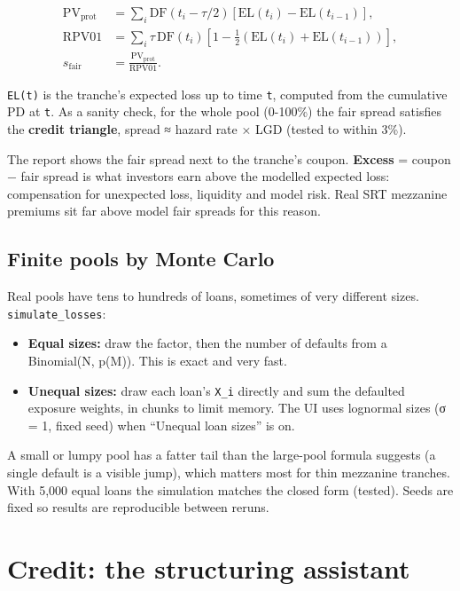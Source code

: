 \documentclass[10pt,a4paper]{article}
\providecommand{\tightlist}{\setlength{\itemsep}{1pt}\setlength{\parskip}{0pt}}
\numberwithin{equation}{section}
\begin{document}
\begin{align}
\mathrm{PV}_{\mathrm{prot}}&=\sum_i\mathrm{DF}(t_i-\tau/2)
\left[\mathrm{EL}(t_i)-\mathrm{EL}(t_{i-1})\right],\\
\mathrm{RPV01}&=\sum_i\tau\,\mathrm{DF}(t_i)
\left[1-\tfrac12\left(\mathrm{EL}(t_i)+\mathrm{EL}(t_{i-1})\right)\right],\\
s_{\mathrm{fair}}&=\frac{\mathrm{PV}_{\mathrm{prot}}}{\mathrm{RPV01}}.
\end{align}

\texttt{EL(t)} is the tranche's expected loss up to time \texttt{t}, computed from the cumulative PD at \texttt{t}. As a sanity check, for the whole pool (0-100\%) the fair spread satisfies the \textbf{credit triangle}, spread ≈ hazard rate × LGD (tested to within 3\%).

The report shows the fair spread next to the tranche's coupon. \textbf{Excess} = coupon − fair spread is what investors earn above the modelled expected loss: compensation for unexpected loss, liquidity and model risk. Real SRT mezzanine premiums sit far above model fair spreads for this reason.

\subsection{Finite pools by Monte Carlo}\label{finite-pools-by-monte-carlo}

Real pools have tens to hundreds of loans, sometimes of very different sizes. \texttt{simulate\_losses}:

\begin{itemize}
\tightlist
\item
  \textbf{Equal sizes:} draw the factor, then the number of defaults from a Binomial(N, p(M)). This is exact and very fast.
\item
  \textbf{Unequal sizes:} draw each loan's \texttt{X\_i} directly and sum the defaulted exposure weights, in chunks to limit memory. The UI uses lognormal sizes (σ = 1, fixed seed) when ``Unequal loan sizes'' is on.
\end{itemize}

A small or lumpy pool has a fatter tail than the large-pool formula suggests (a single default is a visible jump), which matters most for thin mezzanine tranches. With 5,000 equal loans the simulation matches the closed form (tested). Seeds are fixed so results are reproducible between reruns.

\section{Credit: the structuring assistant}\label{credit-the-structuring-assistant}
\end{document}
